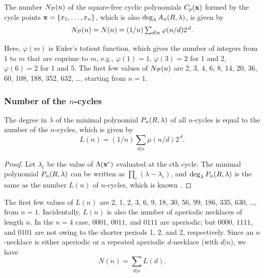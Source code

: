\documentclass{ws-ijbc}
\begin{document}
\begin{theorem}
The number $N_\mathcal P(n)$ of the square-free cyclic polynomials $C_p(\mathbf{x})$
  formed by the cycle points $\mathbf{x} = \{x_1, \ldots, x_n\}$,
  which is also $\deg_\lambda A_n(R, \lambda)$, is given by
\begin{equation}
  N_\mathcal P(n) = N(n) = (1/n) \textstyle\sum_{d|n} \varphi(n/d) 2^{\,d}.
\label{eq:necklace}
\end{equation}
%
\label{thm:necklace}
\end{theorem}
%
Here, $\varphi(m)$ is Euler's totient function,
which gives the number of integers from 1 to $m$
  that are coprime to $m$,
  e.g.,
  $\varphi(1) = 1$,
  $\varphi(3) = 2$ for 1 and 2,
  $\varphi(6) = 2$ for 1 and 5.
The first few values of $N_\mathcal P(n)$ are 2, 3, 4, 6, 8, 14, 20, 36, 60, 108, 188, 352, 632, \ldots,
  starting from $n = 1$.



\subsubsection{Number of the $n$-cycles}


\begin{theorem}
The degree in $\lambda$ of the minimal polynomial $P_n(R, \lambda)$ of all $n$-cycles
  is equal to the number of the $n$-cycles,
  which is given by
\begin{equation}
  L(n) = (1/n)\textstyle\sum_{d | n} \mu(n/d) 2^{\,d}.
\label{eq:lyndon}
\end{equation}
\label{thm:lyndon}
\end{theorem}
%
%
\begin{proof}
Let $\lambda_c$ be the value of $\Lambda(\mathbf{x}^c)$
  evaluated at the $c$th cycle.
The minimal polynomial $P_n(R, \lambda)$
  can be written as $\prod_c (\lambda - \lambda_c)$,
  and $\deg_\lambda P_n(R, \lambda)$ is the same as
  the number $L(n)$ of $n$-cycles, which is known \cite{hao, hao2, lutzky}.
\end{proof}
%
%
The first few values of $L(n)$ are
2, 1, 2, 3, 6, 9, 18, 30, 56, 99, 186, 335, 630, \ldots,
from $n = 1$.
%
Incidentally, $L(n)$ is also the number of aperiodic necklaces of length $n$.
  In the $n = 4$ case,
  $0001$, $0011$, and $0111$ are aperiodic;
  but $0000$, $1111$, and $0101$ are not
  owing to the shorter periods 1, 2, and 2, respectively.
%
Since an $n$-necklace is either aperiodic or
  a repeated aperiodic $d$-necklace (with $d|n$),
  we have
\begin{equation}
  N(n) = \textstyle\sum_{d|n} L(d).
\label{eq:necklacelyndon}
\end{equation}
%
\end{document}
